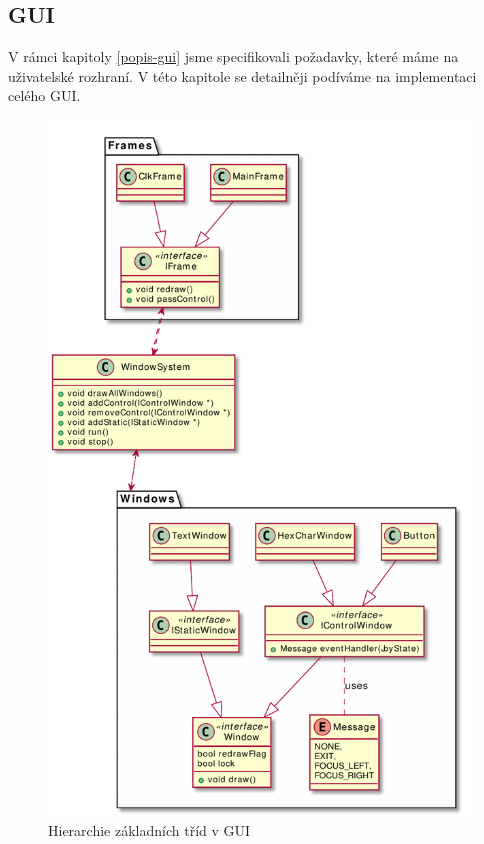 
\subsection{GUI}

V rámci kapitoly \ref{popis-gui} jsme specifikovali požadavky, které máme na uživatelské
rozhraní.
V této kapitole se detailněji podíváme na implementaci celého GUI.

\begin{figure}[tbh!]\centering
\includegraphics[scale=0.75]{../diagrams/stm_gui.pdf}
\caption{Hierarchie základních tříd v GUI}
\label{fig:stm-gui}
\end{figure}

